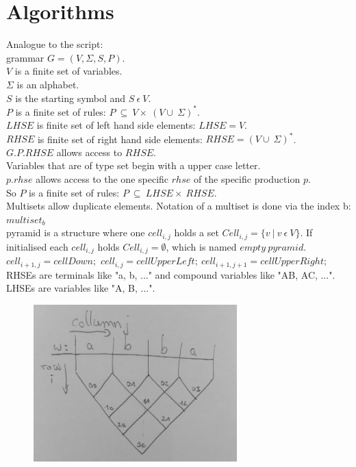 
\section{Algorithms}\label{algorithms}
\noindent Analogue to the script: \\
grammar $G=(V,\Sigma , S, P)$.\\
$V$ is a finite set of variables. \\
$\Sigma$ is an alphabet. \\
$S$ is the starting symbol and $S\ \epsilon\ V$. \\
$P$ is a finite set of rules: $P\ \subseteq\ V \times\ (V \cup\ \Sigma)^{*}$. \\ 
$LHSE$ is finite set of left hand side elements: $LHSE = V$.\\
$RHSE$ is finite set of right hand side elements: $RHSE = (V \cup\ \Sigma)^{*}$.\\
$G.P.RHSE$ allows access to $RHSE$.\\
Variables that are of type set begin with a upper case letter.\\
$p.rhse$ allows access to the one specific $rhse$ of the specific production $p$.\\
So $P$ is a finite set of rules: $P\ \subseteq\ LHSE \times\ RHSE$. \\
Multisets allow duplicate elements. Notation of a multiset is done via the index b: $multiset_b$\\
pyramid is a structure where one $cell_{i,j}$ holds a set  $Cell_{i,j} = \{v\ |\ v\ \epsilon\ V\}$. If initialised each $cell_{i,j}$ holds $Cell_{i,j} = \emptyset $, which is named $empty\ pyramid$. $cell_{i+1,j} = cellDown;$ $cell_{i,j} = cellUpperLeft;\ cell_{i+1,j+1} = cellUpperRight;  $ \\
RHSEs are terminals like "a, b, ..." and compound variables like "AB, AC, ...". \\
LHSEs are variables like "A, B, ...".\\


\begin{figure}[h]
	\centering
	\includegraphics[width=0.7\textwidth]{abb/DataStructurePyramid}
\end{figure}

